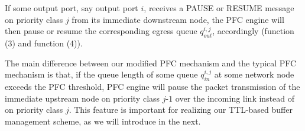 If some output port, say output port $i$, receives a PAUSE or RESUME message on priority class $j$ from its immediate downstream node, the PFC engine will then pause or resume the corresponding egress queue $q_{out}^{i,j}$, accordingly (function (3) and function (4)).

The main difference between our modified PFC mechanism and the typical PFC mechanism is that, if the queue length of some queue $q_{in}^{i,j}$ at some network node exceeds the PFC threshold, PFC engine will pause the packet transmission of the immediate upstream node on priority class $j$-$1$ over the incoming link instead of on priority class $j$. This feature is important for realizing our TTL-based buffer management scheme, as we will introduce in the next.

